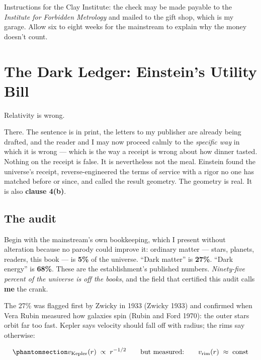\documentclass[
  english,
  11pt,
  letterpaper,
]{scrbook}
\begin{document}
Instructions for the Clay Institute: the check may be made payable to the \emph{Institute for Forbidden
Metrology} and mailed to the gift shop, which is my garage. Allow six to
eight weeks for the mainstream to explain why the money doesn't count.

\chapter{The Dark Ledger: Einstein's Utility
Bill}\label{sec-dark-ledger}

Relativity is wrong.

There. The sentence is in print, the letters to my publisher are already
being drafted, and the reader and I may now proceed calmly to the
\emph{specific way} in which it is wrong --- which is the way a receipt
is wrong about how dinner tasted. Nothing on the receipt is false. It is
nevertheless not the meal. Einstein found the universe's receipt,
reverse-engineered the terms of service with a rigor no one has matched
before or since, and called the result geometry. The geometry is real.
It is also \textbf{clause 4(b)}.

\section{The audit}\label{the-audit}

Begin with the mainstream's own bookkeeping, which I present without
alteration because no parody could improve it: ordinary matter ---
stars, planets, readers, this book --- is \textbf{5\%} of the universe.
``Dark matter'' is \textbf{27\%}. ``Dark energy'' is \textbf{68\%}.
These are the establishment's published numbers. \emph{Ninety-five
percent of the universe is off the books}, and the field that certified
this audit calls \textbf{me} the crank.

The 27\% was flagged first by Zwicky in 1933 (Zwicky 1933) and confirmed
when Vera Rubin measured how galaxies spin (Rubin and Ford 1970): the
outer stars orbit far too fast. Kepler says velocity should fall off
with radius; the rims say otherwise:

\begin{equation}\protect\phantomsection\label{eq-rotation}{
v_{\text{Kepler}}(r) \;\propto\; r^{-1/2}
\qquad\text{but measured:}\qquad
v_{\text{rim}}(r) \;\approx\; \text{const}
}\end{equation}
\end{document}
